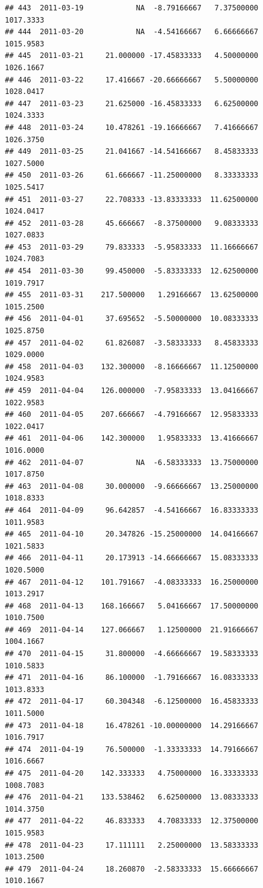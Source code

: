\documentclass[
]{article}
\begin{document}
\begin{verbatim}
## 443  2011-03-19            NA  -8.79166667   7.37500000    1017.3333
## 444  2011-03-20            NA  -4.54166667   6.66666667    1015.9583
## 445  2011-03-21     21.000000 -17.45833333   4.50000000    1026.1667
## 446  2011-03-22     17.416667 -20.66666667   5.50000000    1028.0417
## 447  2011-03-23     21.625000 -16.45833333   6.62500000    1024.3333
## 448  2011-03-24     10.478261 -19.16666667   7.41666667    1026.3750
## 449  2011-03-25     21.041667 -14.54166667   8.45833333    1027.5000
## 450  2011-03-26     61.666667 -11.25000000   8.33333333    1025.5417
## 451  2011-03-27     22.708333 -13.83333333  11.62500000    1024.0417
## 452  2011-03-28     45.666667  -8.37500000   9.08333333    1027.0833
## 453  2011-03-29     79.833333  -5.95833333  11.16666667    1024.7083
## 454  2011-03-30     99.450000  -5.83333333  12.62500000    1019.7917
## 455  2011-03-31    217.500000   1.29166667  13.62500000    1015.2500
## 456  2011-04-01     37.695652  -5.50000000  10.08333333    1025.8750
## 457  2011-04-02     61.826087  -3.58333333   8.45833333    1029.0000
## 458  2011-04-03    132.300000  -8.16666667  11.12500000    1024.9583
## 459  2011-04-04    126.000000  -7.95833333  13.04166667    1022.9583
## 460  2011-04-05    207.666667  -4.79166667  12.95833333    1022.0417
## 461  2011-04-06    142.300000   1.95833333  13.41666667    1016.0000
## 462  2011-04-07            NA  -6.58333333  13.75000000    1017.8750
## 463  2011-04-08     30.000000  -9.66666667  13.25000000    1018.8333
## 464  2011-04-09     96.642857  -4.54166667  16.83333333    1011.9583
## 465  2011-04-10     20.347826 -15.25000000  14.04166667    1021.5833
## 466  2011-04-11     20.173913 -14.66666667  15.08333333    1020.5000
## 467  2011-04-12    101.791667  -4.08333333  16.25000000    1013.2917
## 468  2011-04-13    168.166667   5.04166667  17.50000000    1010.7500
## 469  2011-04-14    127.066667   1.12500000  21.91666667    1004.1667
## 470  2011-04-15     31.800000  -4.66666667  19.58333333    1010.5833
## 471  2011-04-16     86.100000  -1.79166667  16.08333333    1013.8333
## 472  2011-04-17     60.304348  -6.12500000  16.45833333    1011.5000
## 473  2011-04-18     16.478261 -10.00000000  14.29166667    1016.7917
## 474  2011-04-19     76.500000  -1.33333333  14.79166667    1016.6667
## 475  2011-04-20    142.333333   4.75000000  16.33333333    1008.7083
## 476  2011-04-21    133.538462   6.62500000  13.08333333    1014.3750
## 477  2011-04-22     46.833333   4.70833333  12.37500000    1015.9583
## 478  2011-04-23     17.111111   2.25000000  13.58333333    1013.2500
## 479  2011-04-24     18.260870  -2.58333333  15.66666667    1010.1667

\end{verbatim}
\end{document}
